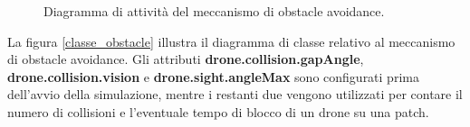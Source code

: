 \begin{figure}[H] 
    \captionsetup{justification=centering, margin=2cm, font=footnotesize}
    \begin{center}
    \end{center}
    \caption[short]{Diagramma di attività del meccanismo di obstacle avoidance.}
    \label{activity_obstacle}
\end{figure}

La figura \ref{classe_obstacle} illustra il diagramma di classe relativo al meccanismo di obstacle avoidance.
Gli attributi \textbf{drone.collision.gapAngle}, \textbf{drone.collision.vision} e \textbf{drone.sight.angleMax} sono configurati prima dell'avvio della simulazione, mentre i restanti due vengono utilizzati per contare il numero di collisioni e l'eventuale tempo di blocco di un drone su una patch.

